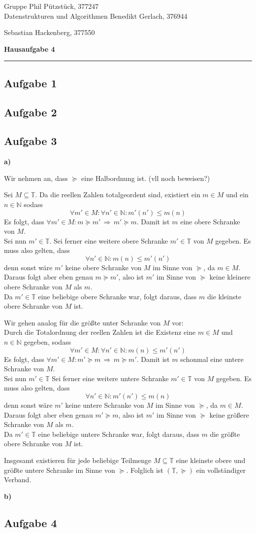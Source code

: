 \documentclass[a4paper,graphics,11pt]{article}
\newcommand{\aufgabe}[1]{\subsection*{Aufgabe #1}}
\begin{document}
\noindent Gruppe              \hfill Phil Pützstück, 377247\\
\noindent Datenstrukturen und Algorithmen \hfill Benedikt Gerlach, 376944\\
\strut\hfill Sebastian Hackenberg, 377550\\
\begin{center}
	\LARGE{\textbf{Hausaufgabe 4}}
\end{center}
\begin{center}
\rule[0.1ex]{\textwidth}{1pt}
\end{center}

\aufgabe{1}
\newpage
\aufgabe{2}
\newpage
\aufgabe{3}
\textbf{a)}

Wir nehmen an, dass $\succeq$ eine Halbordnung ist. (vll noch beweisen?)

Sei $M \subseteq \mathbb{T}$. Da die reellen Zahlen totalgeordent sind, existiert ein
$m \in M$ und ein $n \in \mathbb{N}$ sodass
$$
    \forall m' \in M : \forall n' \in \mathbb{N} : m'(n') \leq m(n)
$$
Es folgt, dass $\forall m' \in M : m \succeq m' \,\Longrightarrow\, m' \succeq m$.
Damit ist $m$ eine obere Schranke von $M$.\\
Sei nun $m' \in \mathbb{T}$. Sei ferner eine weitere obere Schranke $m' \in \mathbb{T}$ von $M$ gegeben.
Es muss also gelten, dass
\begin{equation}
    \forall n' \in \mathbb{N} : m(n) \leq m'(n')
\end{equation}
denn sonst wäre $m'$ keine obere Schranke von $M$ im Sinne von $\succeq$, da $m \in M$.
Daraus folgt aber eben genau $m \succeq m'$, also ist $m'$ im Sinne von $\succeq$ keine 
kleinere obere Schranke von $M$ als $m$.\\
Da $m' \in \mathbb{T}$ eine beliebige obere Schranke war, folgt daraus, dass $m$ die kleinste obere Schranke von $M$ ist.

Wir gehen analog für die größte unter Schranke von $M$ vor:\\
Durch die Totalordnung der reellen Zahlen ist die Existenz eine $m \in M$ und $n \in \mathbb{N}$
gegeben, sodass
$$
    \forall m' \in M : \forall n' \in \mathbb{N} : m(n) \leq m'(n')
$$
Es folgt, dass $\forall m' \in M : m' \succeq m \,\Longrightarrow\, m \succeq m'$. Damit ist $m$ schonmal eine untere Schranke von $M$.\\
Sei nun $m' \in \mathbb{T}$ Sei ferner eine weitere untere Schranke $m' \in \mathbb{T}$ von $M$ gegeben.
Es muss also gelten, dass
$$
    \forall n' \in \mathbb{N} : m'(n') \leq m(n)
$$
denn sonst wäre $m'$ keine untere Schranke von $M$ im Sinne von $\succeq$, da $m \in M$.
Daraus folgt aber eben genau $m' \succeq m$, also ist $m'$ im Sinne von $\succeq$ keine größere
Schranke von $M$ als $m$.\\
Da $m' \in \mathbb{T}$ eine beliebige untere Schranke war, folgt daraus,
dass $m$ die größte obere Schranke von $M$ ist.

Insgesamt existieren für jede beliebige Teilmenge $M \subseteq \mathbb{T}$ eine kleinste obere und größte
untere Schranke im Sinne von $\succeq$. Folglich ist $(\mathbb{T}, \succeq)$ ein vollständiger Verband.

\textbf{b)}
\newpage
\aufgabe{4}
\end{document}
